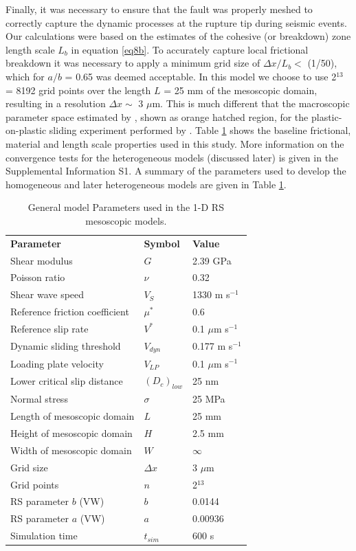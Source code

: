 \documentclass[final,3p, 11pt,authoryear]{elsarticle}
\begin{document}
Finally, it was necessary to ensure that the fault was properly meshed to correctly capture the dynamic processes at the rupture tip during seismic events. Our calculations were based on the estimates of the cohesive (or breakdown) zone length scale $L_{b}$ in equation \eqref{eq8b}. To accurately capture local frictional breakdown it was necessary to apply a minimum grid size of $\Delta x/L_{b} <$ (1/50), which for $a/b$ = 0.65 was deemed acceptable.  In this model we choose to use 2$^{13}$ = 8192 grid points over the length $L$ = 25 mm of the mesoscopic domain, resulting in a resolution $\Delta x \sim$  3 $\mu$m. This is much different that the macroscopic parameter space estimated by \citet{Kaneko2016}, shown as orange hatched region, for the plastic-on-plastic sliding experiment performed by \citet{Latour2013}. Table \ref{table1} shows the baseline frictional, material and length scale properties used in this study. More information on the convergence tests for the heterogeneous models (discussed later) is given in the Supplemental Information S1. A summary of the parameters used to develop the homogeneous and later heterogeneous models are given in Table \ref{table1}.

\begin{table}[ht]
	\centering
	\caption{General model Parameters used in the 1-D RS mesoscopic models.}
	\begin{tabular}{ m{5cm} m{2cm} m{4cm}} 
		\hline  
		\bf{Parameter} 			& \bf{Symbol} 		& \bf{Value}	\\
		Shear modulus  			& $G$  		 	& 2.39 GPa		\\
		Poisson ratio  			& $\nu$  	 	& 0.32 		\\
		Shear wave speed		& $V_{S}$      		& 1330 m s$^{-1}$	\\
		Reference friction coefficient	& $\mu^{*}$	        & 0.6	\\
		Reference slip rate  		& $V^{*}$     		&  0.1 $\mu$m s$^{-1}$\\
		Dynamic sliding threshold   	& $V_{dyn}$  		& 0.177 m s$^{-1}$ \\
		Loading plate velocity  	& $V_{LP}$     		&  0.1 $\mu$m s$^{-1}$\\
		Lower critical slip distance 	& $\left(D_{c}\right)_{low}$    &  25 nm\\
		Normal stress 			& $\sigma$  		&  25 MPa \\
		Length of mesoscopic domain 	&   $L$  		& 25 mm\\
		Height of mesoscopic domain 	&   $H$  		& 2.5 mm\\
		Width of mesoscopic domain 	&   $W$   		& $\infty$\\
		Grid size 			& $\Delta x$ 		& 3 $\mu$m \\
		Grid points 			& $n$ 			& 2$^{13}$ \\
		RS parameter $b$ (VW)  		& $b$ 			& 0.0144  \\
		RS parameter $a$ (VW)  		& $a$ 			& 0.00936  \\
	    Simulation time 			& $t_{sim}$ 		& 600 s  \\
		\hline  	
	\end{tabular}
	\label{table1}
\end{table}
\end{document}
